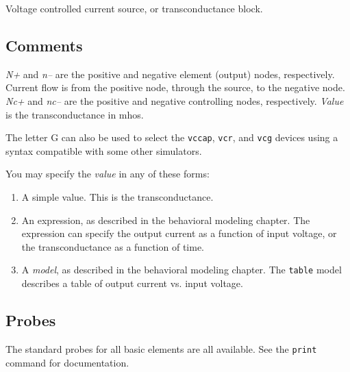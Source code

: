 Voltage controlled current source, or transconductance block.
\subsection{Comments}

{\it N+} and {\it n--} are the positive and negative element (output)
nodes, respectively.  Current flow is from the positive node, through
the source, to the negative node.  {\it Nc+} and {\it nc--} are the
positive and negative controlling nodes, respectively.  {\it Value} is
the transconductance in mhos.

The letter G can also be used to select the {\tt vccap}, {\tt vcr},
and {\tt vcg} devices using a syntax compatible with some other
simulators.

You may specify the {\it value} in any of these forms:

\begin{enumerate}
  
\item
A simple value.  This is the transconductance.
  
\item
An expression, as described in the behavioral modeling chapter.  The
expression can specify the output current as a function of input
voltage, or the transconductance as a function of time.

\item
A {\it model}, as described in the behavioral modeling chapter.  The
{\tt table} model describes a table of output current vs. input
voltage.

\end{enumerate}
\subsection{Probes}

The standard probes for all basic elements are all available.  See the
{\tt print} command for documentation.
